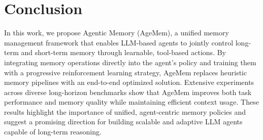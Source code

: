 \section{Conclusion}
In this work, we propose Agentic Memory (AgeMem), a unified memory management framework that enables LLM-based agents to jointly control long-term and short-term memory through learnable, tool-based actions. By integrating memory operations directly into the agent’s policy and training them with a progressive reinforcement learning strategy, AgeMem replaces heuristic memory pipelines with an end-to-end optimized solution. Extensive experiments across diverse long-horizon benchmarks show that AgeMem improves both task performance and memory quality while maintaining efficient context usage. These results highlight the importance of unified, agent-centric memory policies and suggest a promising direction for building scalable and adaptive LLM agents capable of long-term reasoning.